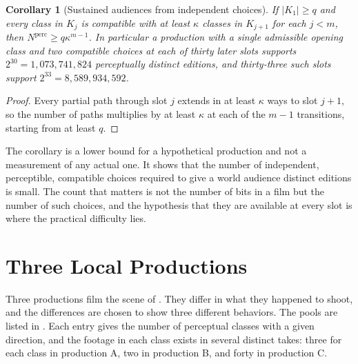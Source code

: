 \documentclass[11pt,twoside,openright]{book}
\theoremstyle{plain}
\newtheorem{corollary}[theorem]{Corollary}
\theoremstyle{definition}
\theoremstyle{remark}
\begin{document}
\begin{corollary}[Sustained audiences from independent choices]\label{cor:bound}
If $\lvert K_1\rvert\ge q$ and every class in $K_j$ is compatible with at least $\kappa$ classes in $K_{j+1}$ for each $j<m$, then $N^{\mathrm{perc}}\ge q\kappa^{m-1}$. In particular a production with a single admissible opening class and two compatible choices at each of thirty later slots supports $2^{30}=1{,}073{,}741{,}824$ perceptually distinct editions, and thirty-three such slots support $2^{33}=8{,}589{,}934{,}592$.
\end{corollary}

\begin{proof}
Every partial path through slot $j$ extends in at least $\kappa$ ways to slot $j+1$, so the number of paths multiplies by at least $\kappa$ at each of the $m-1$ transitions, starting from at least $q$.
\end{proof}

The corollary is a lower bound for a hypothetical production and not a measurement of any actual one. It shows that the number of independent, perceptible, compatible choices required to give a world audience distinct editions is small. The count that matters is not the number of bits in a film but the number of such choices, and the hypothesis that they are available at every slot is where the practical difficulty lies.

\section{Three Local Productions}\label{sec:productions}

Three productions film the scene of . They differ in what they happened to shoot, and the differences are chosen to show three different behaviors. The pools are listed in . Each entry gives the number of perceptual classes with a given direction, and the footage in each class exists in several distinct takes: three for each class in production A, two in production B, and forty in production C.
\end{document}
